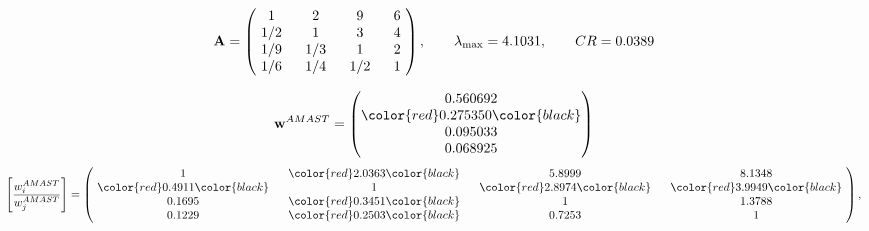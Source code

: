 \begin{example}
\begin{equation*}
\mathbf{A} =
\begin{pmatrix}
$\,\,$ 1 $\,\,$ & $\,\,$2$\,\,$ & $\,\,$9$\,\,$ & $\,\,$6 $\,\,$ \\
$\,\,$ 1/2$\,\,$ & $\,\,$ 1 $\,\,$ & $\,\,$3$\,\,$ & $\,\,$4 $\,\,$ \\
$\,\,$ 1/9$\,\,$ & $\,\,$ 1/3$\,\,$ & $\,\,$ 1 $\,\,$ & $\,\,$2 $\,\,$ \\
$\,\,$ 1/6$\,\,$ & $\,\,$ 1/4$\,\,$ & $\,\,$ 1/2$\,\,$ & $\,\,$ 1  $\,\,$ \\
\end{pmatrix},
\qquad
\lambda_{\max} =
4.1031,
\qquad
CR = 0.0389
\end{equation*}

\begin{equation*}
\mathbf{w}^{AMAST} =
\begin{pmatrix}
0.560692\\
\color{red} 0.275350\color{black} \\
0.095033\\
0.068925
\end{pmatrix}\end{equation*}
\begin{equation*}
\left[ \frac{{w}^{AMAST}_i}{{w}^{AMAST}_j} \right] =
\begin{pmatrix}
$\,\,$ 1 $\,\,$ & $\,\,$\color{red} 2.0363\color{black} $\,\,$ & $\,\,$5.8999$\,\,$ & $\,\,$8.1348$\,\,$ \\
$\,\,$\color{red} 0.4911\color{black} $\,\,$ & $\,\,$ 1 $\,\,$ & $\,\,$\color{red} 2.8974\color{black} $\,\,$ & $\,\,$\color{red} 3.9949\color{black}   $\,\,$ \\
$\,\,$0.1695$\,\,$ & $\,\,$\color{red} 0.3451\color{black} $\,\,$ & $\,\,$ 1 $\,\,$ & $\,\,$1.3788 $\,\,$ \\
$\,\,$0.1229$\,\,$ & $\,\,$\color{red} 0.2503\color{black} $\,\,$ & $\,\,$0.7253$\,\,$ & $\,\,$ 1  $\,\,$ \\
\end{pmatrix},
\end{equation*}


\end{example}
